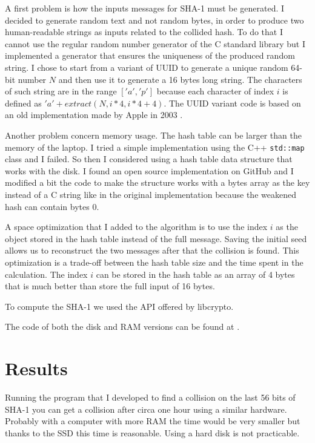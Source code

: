 \documentclass[11pt]{article}
\begin{document}
A first problem is how the inputs messages for SHA-1 must be generated. I decided to generate random text and not random bytes, in order to produce two human-readable strings as inputs related to the collided hash.
To do that I cannot use the regular random number generator of the C standard library but I implemented a generator that ensures the uniqueness of the produced random string. I chose to start from a variant of UUID to generate a unique random 64-bit number $N$ and then use it to generate a 16 bytes long string.
The characters of such string are in the range $['a', 'p']$ because each character of index $i$ is defined as $'a' + extract(N, i * 4, i * 4 + 4)$.
The UUID variant code is based on an old implementation made by Apple in 2003 \cite{uuid}.

Another problem concern memory usage. The hash table can be larger than the memory of the laptop. I tried a simple implementation using the C++ \verb|std::map| class and I failed. So then I considered using a hash table data structure that works with the disk. I found an open source implementation on GitHub \cite{diskhash} and I modified a bit the code to make the structure works with a bytes array as the key instead of a C string like in the original implementation because the weakened hash can contain bytes 0.

A space optimization that I added to the algorithm is to use the index $i$ as the object stored in the hash table instead of the full message. Saving the initial seed allows us to reconstruct the two messages after that the collision is found. This optimization is a trade-off between the hash table size and the time spent in the calculation. The index $i$ can be stored in the hash table as an array of 4 bytes that is much better than store the full input of 16 bytes.

To compute the SHA-1 we used the API offered by libcrypto.

The code of both the disk and RAM versions can be found at \cite{code}.

\section{Results}

Running the program that I developed to find a collision on the last 56 bits of SHA-1 you can get a collision after circa one hour using a similar hardware. Probably with a computer with more RAM the time would be very smaller but thanks to the SSD this time is reasonable. Using a hard disk is not practicable.
\end{document}
